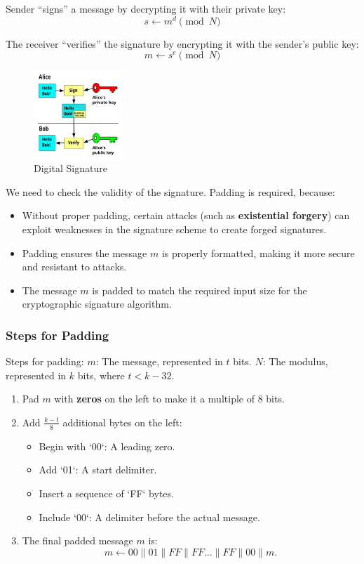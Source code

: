 Sender ``signs'' a message by decrypting it with their private key:
\[ s \leftarrow m^d \pmod{N} \]

The receiver ``verifies'' the signature by encrypting it with the sender's public key:
\[ m \leftarrow s^e \pmod{N} \]

\begin{figure}[h!]
    \centering
    \includegraphics[width=0.3\textwidth]{img/Private_key_signing.svg.png}
    \caption{Digital Signature}
\end{figure}

We need to check the validity of the signature. Padding is required, because:
\begin{itemize}
    \item Without proper padding, certain attacks (such as \textbf{existential forgery}) can exploit weaknesses in the signature scheme to create forged signatures.
    \item Padding ensures the message \( m \) is properly formatted, making it more secure and resistant to attacks.
    \item The message \( m \) is padded to match the required input size for the cryptographic signature algorithm.
\end{itemize}

\subsubsection{Steps for Padding}

Steps for padding: \( m \): The message, represented in \( t \) bits.
\( N \): The modulus, represented in \( k \) bits, where \( t < k-32 \).

\begin{enumerate}
    \item Pad \( m \) with \textbf{zeros} on the left to make it a multiple of 8 bits.
    \item Add \( \frac{k-t}{8} \) additional bytes on the left:
    \begin{itemize}
        \item Begin with `00`: A leading zero.
        \item Add `01`: A start delimiter.
        \item Insert a sequence of `FF` bytes.
        \item Include `00`: A delimiter before the actual message.
    \end{itemize}
    \item The final padded message \( m \) is:
    \[
    m \leftarrow 00 \parallel 01 \parallel FF \parallel FF \ldots \parallel FF \parallel 00 \parallel m.
    \]
\end{enumerate}

